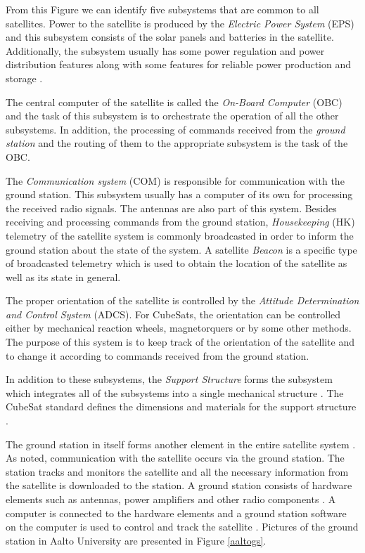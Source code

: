\documentclass[english,12pt,a4paper,pdftex,elec,utf8]{aaltothesis}
\begin{document}
From this Figure we can identify five subsystems that are common to all satellites. Power to the satellite is produced by the \textit{Electric Power System} (EPS) and this subsystem consists of the solar panels and batteries in the satellite. Additionally, the subsystem usually has some power regulation and power distribution features along with some features for reliable power production and storage \cite{spacesystemsengineering}.\par 
The central computer of the satellite is called the \textit{On-Board Computer} (OBC) and the task of this subsystem is to orchestrate the operation of all the other subsystems. In addition, the processing of commands received from the \textit{ground station} and the routing of them to the appropriate subsystem is the task of the OBC. \cite{spacesystemsengineering} \par 
The \textit{Communication system} (COM) is responsible for communication with the ground station. This subsystem usually has a computer of its own for processing the received radio signals. The antennas are also part of this system. Besides receiving and processing commands from the ground station, \textit{Housekeeping} (HK) telemetry of the satellite system is commonly broadcasted in order to inform the ground station about the state of the system. A satellite \textit{Beacon} is a specific type of broadcasted telemetry which is used to obtain the location of the satellite as well as its state in general.   \cite{spacesystemsengineering} \par
The proper orientation of the satellite is controlled by the \textit{Attitude Determination and Control System} (ADCS). For CubeSats, the orientation can be controlled either by mechanical reaction wheels, magnetorquers or by some other methods. The purpose of this system is to keep track of the orientation of the satellite and to change it according to commands received from the ground station. \cite{spacesystemsengineering}\par 
In addition to these subsystems, the \textit{Support Structure} forms the subsystem which integrates all of the subsystems into a single mechanical structure \cite{spacesystemsengineering}. The CubeSat standard defines the dimensions and materials for the support structure \cite{cds}. \par 
The ground station in itself forms another element in the entire satellite system \cite{spacesystemsengineering}. As noted, communication with the satellite occurs via the ground station. The station tracks and monitors the satellite and all the necessary information from the satellite is downloaded to the station. A ground station consists of hardware elements such as antennas, power amplifiers and other radio components \cite{radiohandbook}. A computer is connected to the hardware elements and a ground station software on the computer is used to control and track the satellite \cite{spacesystemsengineering, radiohandbook}. Pictures of the ground station in Aalto University are presented in Figure \ref{aaltogs}.
\end{document}

